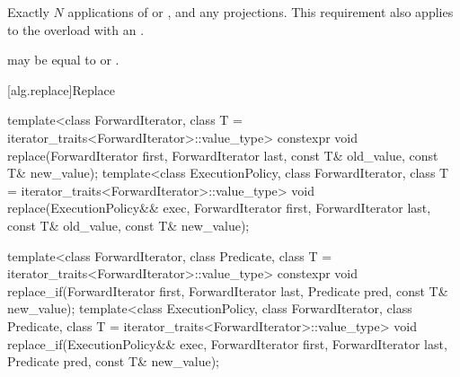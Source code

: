 \begin{itemdescr}
\pnum
\complexity
Exactly $N$ applications of  or , and
any projections.
This requirement also applies to the overload with an .

\pnum
\remarks
{} may be equal to  or .
\end{itemdescr}

[alg.replace]{Replace}

%
%
\begin{itemdecl}
template<class ForwardIterator, class T = iterator_traits<ForwardIterator>::value_type>
  constexpr void replace(ForwardIterator first, ForwardIterator last,
                         const T& old_value, const T& new_value);
template<class ExecutionPolicy, class ForwardIterator,
         class T = iterator_traits<ForwardIterator>::value_type>
  void replace(ExecutionPolicy&& exec,
               ForwardIterator first, ForwardIterator last,
               const T& old_value, const T& new_value);

template<class ForwardIterator, class Predicate,
         class T = iterator_traits<ForwardIterator>::value_type>
  constexpr void replace_if(ForwardIterator first, ForwardIterator last,
                            Predicate pred, const T& new_value);
template<class ExecutionPolicy, class ForwardIterator, class Predicate,
         class T = iterator_traits<ForwardIterator>::value_type>
  void replace_if(ExecutionPolicy&& exec,
                  ForwardIterator first, ForwardIterator last,
                  Predicate pred, const T& new_value);


\end{itemdecl}
